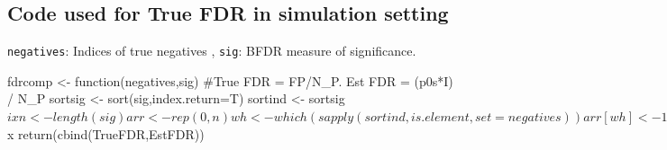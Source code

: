 \documentclass[11pt]{article}
\begin{document}
\subsection{Code used for True FDR in simulation setting}\label{truefdr}
{\tt negatives}: Indices of true negatives , {\tt sig}: BFDR measure of significance.
\begin{Schunk}
\begin{Sinput}
fdrcomp <- function(negatives,sig){
#True FDR = FP/N_P. Est FDR = \sum (p0s*I) / N_P
sortsig <- sort(sig,index.return=T)
sortind <- sortsig$ix
n <- length(sig)
arr <- rep(0,n)
wh <- which(sapply(sortind,is.element,set=negatives))
arr[wh] <- 1
FP <- cumsum(arr)
TrueFDR <- FP/1:n
EstFDR <- sortsig$x
return(cbind(TrueFDR,EstFDR))
}
\end{Sinput}
\end{Schunk}


\end{document}

